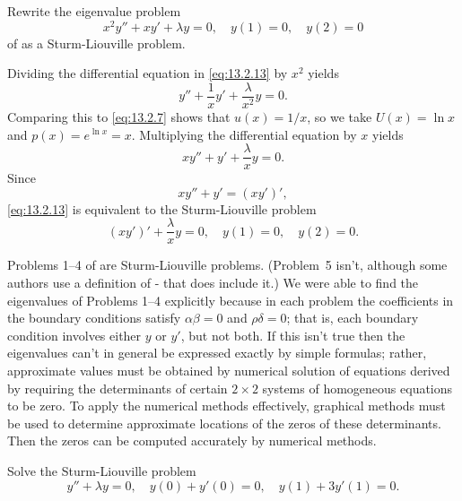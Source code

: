 \begin{example}\label{example:13.2.4}
Rewrite the eigenvalue problem
\begin{equation} \label{eq:13.2.13}
x^{2}y''+xy'+\lambda y=0,\quad y(1)=0,\quad y(2)=0
\end{equation}
of   as a Sturm-Liouville problem.
\end{example}

\begin{solution}
Dividing the differential equation in \eqref{eq:13.2.13} by $x^{2}$  yields
\[
y''+\frac{1}{x}y'+\frac{\lambda}{x^{2}}y=0.
\]
Comparing this to \eqref{eq:13.2.7} shows that $u(x)=1/x$, so we take $U(x)=\ln
x$ and $p(x)=e^{\ln x}=x$.
Multiplying the differential equation by $x$ yields
\[
xy''+y'+\frac{\lambda}{x}y=0.
\]
Since
\[
xy''+y'=(xy')',
\]
\eqref{eq:13.2.13} is equivalent to the Sturm-Liouville problem
\begin{equation} \label{eq:13.2.14}
(xy')'+\frac{\lambda}{x}y=0,\quad y(1)=0,\quad y(2)=0.
\end{equation}
\end{solution}

Problems 1--4 of  are Sturm-Liouville problems.
(Problem~5 isn't, although some authors use a definition of
-
that does include it.)  We were able to find
the eigenvalues of Problems 1--4  explicitly because in each problem the
coefficients in the boundary conditions satisfy $\alpha\beta=0$ and
$\rho\delta=0$; that is, each boundary condition  involves either $y$
or $y'$, but not both. If this isn't true then the eigenvalues can't in
general be expressed exactly by simple formulas;     rather, approximate
values
must be obtained by numerical solution of equations derived by requiring
the determinants of certain $2\times 2$ systems of homogeneous equations to
be zero. To apply the numerical methods effectively, graphical methods
must be used to determine approximate locations of the zeros of these
determinants. Then the zeros can be computed accurately by
numerical methods.

\begin{example}  \label{example:13.2.5}
Solve the Sturm-Liouville problem
\begin{equation} \label{eq:13.2.15}
y''+\lambda y=0, \quad y(0)+y'(0)=0,\quad y(1)+3y'(1)=0.
\end{equation}
\end{example}

